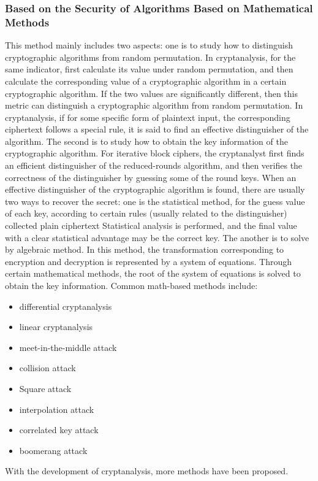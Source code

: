 \subsubsection{Based on the Security of Algorithms Based on Mathematical Methods}
This method mainly includes two aspects: one is to study how to distinguish cryptographic algorithms from random permutation. In cryptanalysis, for the same indicator, first calculate its value under random permutation, and then calculate the corresponding value of a cryptographic algorithm in a certain cryptographic algorithm. If the two values are significantly different, then this metric can distinguish a cryptographic algorithm from random permutation. In cryptanalysis, if for some specific form of plaintext input, the corresponding ciphertext follows a special rule, it is said to find an effective distinguisher of the algorithm. The second is to study how to obtain the key information of the cryptographic algorithm. For iterative block ciphers, the cryptanalyst first finds an efficient distinguisher of the reduced-rounds algorithm, and then verifies the correctness of the distinguisher by guessing some of the round keys. When an effective distinguisher of the cryptographic algorithm is found, there are usually two ways to recover the secret: one is the statistical method, for the guess value of each key, according to certain rules (usually related to the distinguisher) collected plain ciphertext Statistical analysis is performed, and the final value with a clear statistical advantage may be the correct key. The another is to solve by algebraic method. In this method, the transformation corresponding to encryption and decryption is represented by a system of equations. Through certain mathematical methods, the root of the system of equations is solved to obtain the key information. Common math-based methods include:
\begin{itemize}
    \item differential cryptanalysis
    \item linear cryptanalysis
    \item meet-in-the-middle attack
    \item collision attack 
    \item Square attack 
    \item interpolation attack
    \item correlated key attack 
    \item boomerang attack
\end{itemize}
With the development of cryptanalysis, more methods have been proposed.

